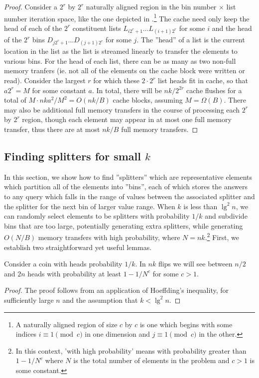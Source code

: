 \begin{proof}
Consider a $2^r$ by $2^r$ naturally aligned region in the bin number $\times$ list
number iteration space, like the one depicted in 
.\footnote{A naturally aligned region
of size $c$ by $c$ is one which begins with some indices $i \equiv 1 \pmod{c}$ 
in one dimension and $j \equiv 1 \pmod{c}$ in the other.}  
The cache need only keep the head of each of the $2^r$ constituent
lists $L_{i2^r + 1} \ldots L_{(i+1)2^r}$ for some $i$ and the head of the $2^r$ bins 
$D_{j2^r + 1} \ldots D_{(j+1)2^r}$ for some $j$. 
The ''head'' of a list is the current location
in the list as the list is streamed linearly to transfer the elements to various bins.  
For the head of each list, there can be as many as
two non-full memory tranfers (ie. not all of the elements on the cache block were
written or read).  Consider the largest $r$ for which these $2 \cdot 2^r$ list heads
fit in cache, so that $a2^r = M$ for some constant $a$.  In total, there will be 
$nk/2^{2r}$ cache flushes for a total of $M \cdot nka^2/M^2 = O(nk/B)$ cache blocks, 
assuming $M = \Omega(B)$.  There may also be additional full memory transfers in the
course of processing each $2^r$ by $2^r$ region, though
each element may appear in at most one full memory transfer, thus there are at most
$nk/B$ full memory transfers.  
\end{proof}

\subsection*{Finding splitters for small $k$}

In this section, we show how to find ''splitters'' which are representative elements
which partition all of the elements into ''bins'', each of which stores the answers to any
query which falls in the range of values between the associated splitter and the
splitter for the next bin of larger value range.
When $k$ is less than $\lg^2 n$, we can randomly select elements to be splitters
with probability $1/k$ and subdivide bins that are too large, potentially generating
extra splitters, while generating $O(N/B)$ memory transfers with high
probability, where $N=nk$.\footnote{In this context, 'with high probability' means with probability greater
than $1-1/N^c$ where $N$ is the total number of elements in the problem and $c > 1$
is some constant.} First, we establish two straightforward yet useful lemmas.

\begin{lemma}
  Consider a coin with heads probability $1/k$.  In $nk$ flips we will see
  between $n/2$ and $2n$ heads with probability at least $1-1/N^c$ for some $c>1$.
  \label{lem:number_of_flips}
\end{lemma}
\begin{proof}
  The proof follows from an application of Hoeffding's inequality, for sufficiently
  large $n$ and the assumption that $k < \lg ^2 n$.
\end{proof}

